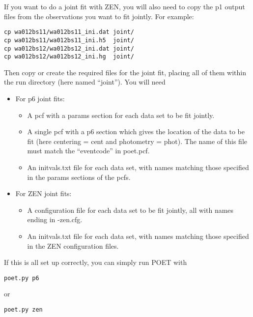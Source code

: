 \documentclass[letterpaper,12pt]{article}
\begin{document}
If you want to do a joint fit with ZEN, you will also need to copy
the p1 output files from the observations you want to fit jointly.
For example:

\begin{verbatim}
cp wa012bs11/wa012bs11_ini.dat joint/
cp wa012bs11/wa012bs11_ini.h5  joint/
cp wa012bs12/wa012bs12_ini.dat joint/
cp wa012bs12/wa012bs12_ini.hg  joint/
\end{verbatim}

Then copy or create the required files for the joint fit, placing all
of them within the run directory (here named ``joint''). You will need

\begin{itemize}
\item For p6 joint fits:
  \begin{itemize}
\item A pcf with a params section for each data set to be fit jointly.

\item A single pcf with a p6 section which gives the location of the
  data to be fit (here centering = cent and photometry = phot). The
  name of this file must match the ``eventcode'' in poet.pcf.

\item An initvals.txt file for each data set, with names matching
  those specified in the params sections of the pcfs.
  \end{itemize}
\item For ZEN joint fits:
  \begin{itemize}
  \item A configuration file for each data set to be fit jointly, all with
    names ending in -zen.cfg.

  \item An initvals.txt file for each data set, with names matching those
    specified in the ZEN configuration files.
  \end{itemize}
\end{itemize}


If this is all set up correctly, you can simply run POET with

\begin{verbatim}
poet.py p6
\end{verbatim}

\noindent
or

\begin{verbatim}
poet.py zen
\end{verbatim}
\end{document}
